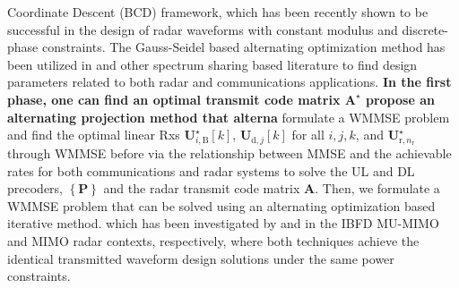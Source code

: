 \documentclass[10pt,journal]{IEEEtran}
\newcommand{\bracket}[1]{{\left [{#1}\right ]}}
\newcommand{\braces}[1]{{\left\{ {#1}\right\}}}
\newcommand{\B}{\textrm{B}}
\newcommand{\rnr}{_{\mathrm{r},n_\mathrm{r}}}
\newcommand{\UBj}{\mathbf{U}_{\textrm{d},j}\bracket{k}}
\theoremstyle{definition}
\begin{document}
Coordinate Descent (BCD) framework, which has been recently
shown to be successful in the design of radar waveforms with constant modulus and discrete-phase constraints. The Gauss-Seidel based alternating optimization method has been utilized in \cite{MCMIMO_RadComm,qian2018joint} and other spectrum sharing based literature to find design parameters related to both radar and communications applications.  \textbf{In the first phase, one can find an optimal transmit code matrix $\mathbf{A}^\star$ propose an alternating projection method that alterna}  formulate a WMMSE problem and find the optimal linear Rxs $\mathbf{U}^\star_{i,\B}\bracket{k}$, $\UBj$ for all $i,j,k$, and $\mathbf{U}^\star\rnr$ through WMMSE before  via the relationship between MMSE and the achievable rates for both communications and radar systems to solve the UL and DL precoders, $\braces{\mathbf{P}}$ and the radar transmit code matrix $\mathbf{A}$. Then, we formulate a WMMSE problem that can be solved using an alternating optimization based iterative method. which has been investigated by \cite{FD_WMMSE} and \cite{mutualinformation_mmse} in the IBFD MU-MIMO and MIMO radar contexts, respectively, where both techniques achieve the identical transmitted waveform design solutions under the same power constraints.  
\fi
\end{document}
